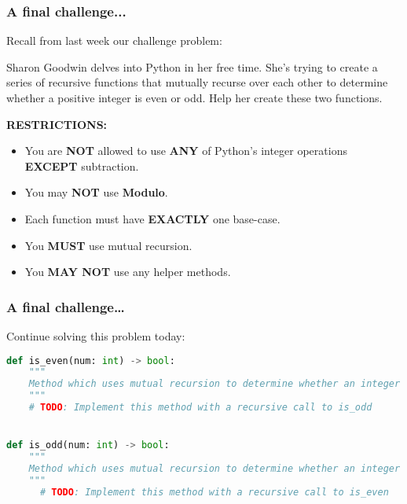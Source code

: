 \documentclass[hyperref={colorlinks,citecolor=blue,linkcolor=blue,urlcolor=blue}]{beamer}
\begin{document}
\begin{frame}
  \frametitle{A final challenge...}
Recall from last week our challenge problem:

Sharon Goodwin delves into Python in her free time. She's trying to create a series of recursive functions that mutually recurse over each other to determine whether a positive integer is even or odd. Help her create these two functions.
\begin{center}
  \textbf{RESTRICTIONS:}
  \begin{itemize}
    \item You are \textbf{NOT} allowed to use \textbf{ANY} of Python's integer operations \textbf{EXCEPT} subtraction.
    \item You may \textbf{NOT} use \textbf{Modulo}.
    \item Each function must have \textbf{EXACTLY} one base-case.
    \item You \textbf{MUST} use mutual recursion.
    \item You \textbf{MAY NOT} use any helper methods.
  \end{itemize}  
\end{center}
\end{frame}
\begin{frame}[fragile]
  \frametitle{A final challenge\ldots}
  Continue solving this problem today: 
  \begin{lstlisting}[language=Python, style=mystyle]
def is_even(num: int) -> bool:
    """
    Method which uses mutual recursion to determine whether an integer is even or odd.
    """
    # TODO: Implement this method with a recursive call to is_odd


def is_odd(num: int) -> bool:
    """
    Method which uses mutual recursion to determine whether an integer is even or odd.
    """
      # TODO: Implement this method with a recursive call to is_even
    \end{lstlisting}    
\end{frame}
\end{document}

